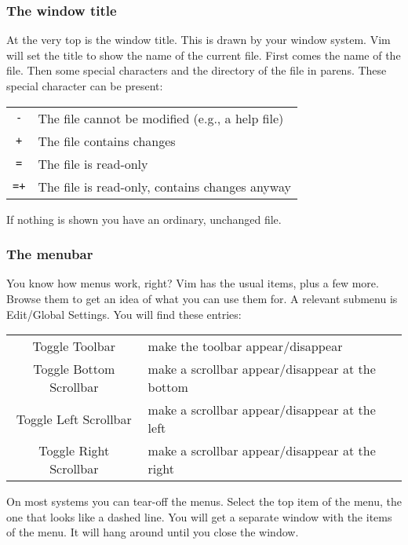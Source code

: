 \subsubsection{The window title}
At the very top is the window title.  This is drawn by your window system.
Vim will set the title to show the name of the current file.  First comes the
name of the file.  Then some special characters and the directory of the file
in parens.  These special character can be present:

\begin{center}\begin{longtable}{c l}
				\texttt{-} & The file cannot be modified (e.g., a help file) \\
				\texttt{+} & The file contains changes \\
				\texttt{=} & The file is read-only \\
				\texttt{=+} & The file is read-only, contains changes anyway \\
\end{longtable}\end{center}
If nothing is shown you have an ordinary, unchanged file.
\subsubsection{The menubar}
You know how menus work, right?  Vim has the usual items, plus a few more.
Browse them to get an idea of what you can use them for.
A relevant submenu is Edit/Global Settings.
You will find these entries:

\begin{center}\begin{longtable}{c l}
				Toggle Toolbar & make the toolbar appear/disappear \\
				Toggle Bottom Scrollbar & make a scrollbar appear/disappear at the bottom \\
				Toggle Left Scrollbar & make a scrollbar appear/disappear at the left \\
				Toggle Right Scrollbar & make a scrollbar appear/disappear at the right \\
\end{longtable}\end{center}

On most systems you can tear-off the menus.
Select the top item of the menu, the one that looks like a dashed line.
You will get a separate window with the items of the menu.
It will hang around until you close the window.

